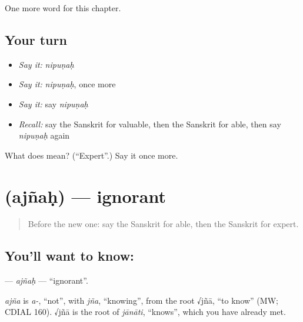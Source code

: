 \begin{grammarlens}[title={What you've built}]
One more word for this chapter.
\end{grammarlens}

\subsection*{Your turn}
\begin{itemize}
\raggedright
  \item \emph{Say it:} \emph{nipuṇaḥ}
  \item \emph{Say it:} \emph{nipuṇaḥ}, once more
  \item \emph{Say it:} say \emph{nipuṇaḥ}
  \item \emph{Recall:} say the Sanskrit for valuable, then the Sanskrit for able, then say \emph{nipuṇaḥ} again
\end{itemize}

\begin{tcolorbox}[breakable,colback=teal!4,colframe=teal!35!black,title={Before you move on}]
What does  mean? (\textquotedblleft{}Expert\textquotedblright{}.) Say it once more.
\end{tcolorbox}
\section[\texorpdfstring{\sk{अज्ञः} (ajñaḥ)}{अज्ञः (ajñaḥ)}]{ (ajñaḥ) — ignorant}

\label{lesson:SA-C216-ajnah}



\begin{quote}
Before the new one: say the Sanskrit for able, then the Sanskrit for expert.
\end{quote}

\subsection*{You'll want to know: }
\textbf{} — \emph{ajñaḥ} — \textquotedblleft{}ignorant\textquotedblright{}.

\begin{cousinweb}
\emph{ajña} is \emph{a-}, \textquotedblleft{}not\textquotedblright{}, with \emph{jña}, \textquotedblleft{}knowing\textquotedblright{}, from the root √jñā, \textquotedblleft{}to know\textquotedblright{} (MW; CDIAL 160). √jñā is the root of \emph{jānāti}, \textquotedblleft{}knows\textquotedblright{}, which you have already met.
\end{cousinweb}

